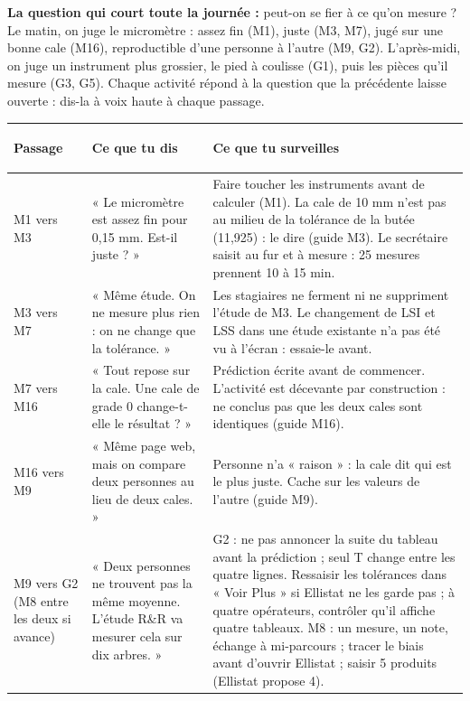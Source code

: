 \documentclass[10pt,a4paper]{article}
\begin{document}
\newpage
{}
\small
\textbf{La question qui court toute la journée :} peut-on se fier à ce qu'on mesure ? Le matin, on juge le micromètre : assez fin (M1), juste (M3, M7), jugé sur une bonne cale (M16), reproductible d'une personne à l'autre (M9, G2). L'après-midi, on juge un instrument plus grossier, le pied à coulisse (G1), puis les pièces qu'il mesure (G3, G5). Chaque activité répond à la question que la précédente laisse ouverte : dis-la à voix haute à chaque passage.
\par\vspace{3pt}
\renewcommand{\arraystretch}{1.2}\footnotesize
\begin{tabularx}{\linewidth}{|>{\bfseries\raggedright\arraybackslash}p{19mm}|>{\raggedright\arraybackslash}p{56mm}|>{\raggedright\arraybackslash}X|}\hline
\rowcolor{uimm}\color{white}\textbf{Passage} & \color{white}\textbf{Ce que tu dis} & \color{white}\textbf{Ce que tu surveilles}\\\hline
M1 vers M3 & « Le micromètre est assez fin pour 0,15 mm. Est-il juste ? » & Faire toucher les instruments avant de calculer (M1). La cale de 10 mm n'est pas au milieu de la tolérance de la butée (11,925) : le dire (guide M3). Le secrétaire saisit au fur et à mesure : 25 mesures prennent 10 à 15 min.\\ \hline
M3 vers M7 & « Même étude. On ne mesure plus rien : on ne change que la tolérance. » & Les stagiaires ne ferment ni ne suppriment l'étude de M3. Le changement de LSI et LSS dans une étude existante n'a pas été vu à l'écran : essaie-le avant.\\ \hline
M7 vers M16 & « Tout repose sur la cale. Une cale de grade 0 change-t-elle le résultat ? » & Prédiction écrite avant de commencer. L'activité est décevante par construction : ne conclus pas que les deux cales sont identiques (guide M16).\\ \hline
M16 vers M9 & « Même page web, mais on compare deux personnes au lieu de deux cales. » & Personne n'a « raison » : la cale dit qui est le plus juste. Cache sur les valeurs de l'autre (guide M9).\\ \hline
M9 vers G2 (M8 entre les deux si avance) & « Deux personnes ne trouvent pas la même moyenne. L'étude R\&R va mesurer cela sur dix arbres. » & G2 : ne pas annoncer la suite du tableau avant la prédiction ; seul T change entre les quatre lignes. Ressaisir les tolérances dans « Voir Plus » si Ellistat ne les garde pas ; à quatre opérateurs, contrôler qu'il affiche quatre tableaux. M8 : un mesure, un note, échange à mi-parcours ; tracer le biais avant d'ouvrir Ellistat ; saisir 5 produits (Ellistat propose 4).\\ \hline

\end{tabularx}
\end{document}
